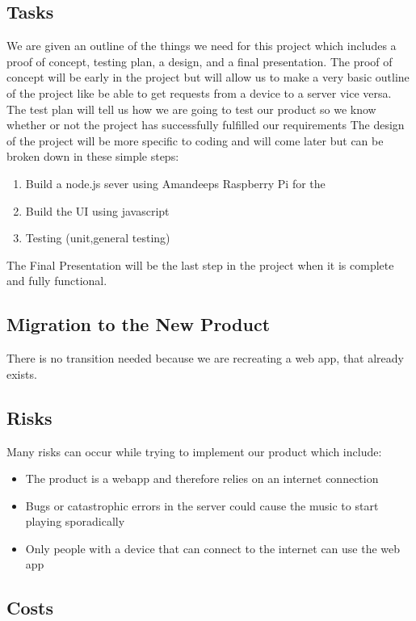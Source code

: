 \documentclass[12pt, titlepage]{article}
\begin{document}
\subsection{Tasks}

We are given an outline of the things we need for this project which includes a proof of concept, testing plan, a design, and a final presentation. The proof of concept will be early in the project but will allow us to make a very basic outline of the project like be able to get requests from a device to a server vice versa. The test plan will tell us how we are going to test our product so we know whether or not the project has successfully fulfilled our requirements The design of the project will be more specific to coding and will come later but can be broken down in these simple steps:
\begin{enumerate}
\item Build a node.js sever using Amandeeps Raspberry Pi for the
\item Build the UI using javascript
\item Testing (unit,general testing)
\end{enumerate}
The Final Presentation will be the last step in the project when it is complete and fully functional.
\subsection{Migration to the New Product}

There is no transition needed because we are recreating a web app, that already exists.

\subsection{Risks}

Many risks can occur while trying to implement our product which include:
\begin{itemize}
\item The product is a webapp and therefore relies on an internet connection
\item Bugs or catastrophic errors in the server could cause the music to start playing sporadically
\item Only people with a device that can connect to the internet can use the web app
\end{itemize}

\subsection{Costs}
\end{document}
